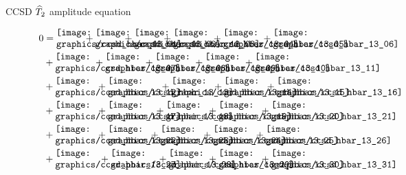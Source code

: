 \begin{frame}{CCSD $\widehat{T}_2$ amplitude equation }

\begin{align*}
    0 &= 
    \parbox{10mm}{\texttt{[image: graphics/ccsd\_hbar\_13\_01]}} + 
    \parbox{10mm}{\texttt{[image: graphics/ccsd\_hbar\_13\_02]}} + 
    \parbox{10mm}{\texttt{[image: graphics/ccsd\_hbar\_13\_03]}} +
    \parbox{14mm}{\texttt{[image: graphics/ccsd\_hbar\_13\_04]}} + 
    \parbox{14mm}{\texttt{[image: graphics/ccsd\_hbar\_13\_05]}} + 
    \parbox{14mm}{\texttt{[image: graphics/ccsd\_hbar\_13\_06]}} \nn
    & + \parbox{14mm}{\texttt{[image: graphics/ccsd\_hbar\_13\_07]}} + 
    \parbox{14mm}{\texttt{[image: graphics/ccsd\_hbar\_13\_08]}} + 
    \parbox{14mm}{\texttt{[image: graphics/ccsd\_hbar\_13\_09]}} +
    \parbox{14mm}{\texttt{[image: graphics/ccsd\_hbar\_13\_10]}} + 
    \parbox{14mm}{\texttt{[image: graphics/ccsd\_hbar\_13\_11]}} \nn
    & + \parbox{15mm}{\texttt{[image: graphics/ccsd\_hbar\_13\_12]}} +
    \parbox{19mm}{\texttt{[image: graphics/ccsd\_hbar\_13\_13]}} + 
    \parbox{15mm}{\texttt{[image: graphics/ccsd\_hbar\_13\_14]}} +
    \parbox{15mm}{\texttt{[image: graphics/ccsd\_hbar\_13\_15]}} + 
    \parbox{15mm}{\texttt{[image: graphics/ccsd\_hbar\_13\_16]}} \nn
    & + \parbox{15mm}{\texttt{[image: graphics/ccsd\_hbar\_13\_17]}} +
    \parbox{17mm}{\texttt{[image: graphics/ccsd\_hbar\_13\_18]}} + 
    \parbox{15mm}{\texttt{[image: graphics/ccsd\_hbar\_13\_19]}} +
    \parbox{15mm}{\texttt{[image: graphics/ccsd\_hbar\_13\_20]}} + 
    \parbox{15mm}{\texttt{[image: graphics/ccsd\_hbar\_13\_21]}} \nn
    & + \parbox{15mm}{\texttt{[image: graphics/ccsd\_hbar\_13\_22]}} + 
    \parbox{15mm}{\texttt{[image: graphics/ccsd\_hbar\_13\_23]}} +
    \parbox{15mm}{\texttt{[image: graphics/ccsd\_hbar\_13\_24]}} + 
    \parbox{15mm}{\texttt{[image: graphics/ccsd\_hbar\_13\_25]}} +
    \parbox{15mm}{\texttt{[image: graphics/ccsd\_hbar\_13\_26]}} \nn
    & + \parbox{16mm}{\texttt{[image: graphics/ccsd\_hbar\_13\_27]}} +
    \parbox{17mm}{\texttt{[image: graphics/ccsd\_hbar\_13\_28]}} + 
    \parbox{14mm}{\texttt{[image: graphics/ccsd\_hbar\_13\_29]}} +
    \parbox{15mm}{\texttt{[image: graphics/ccsd\_hbar\_13\_30]}} + 
    \parbox{15mm}{\texttt{[image: graphics/ccsd\_hbar\_13\_31]}}
\end{align*}

\end{frame}

    
